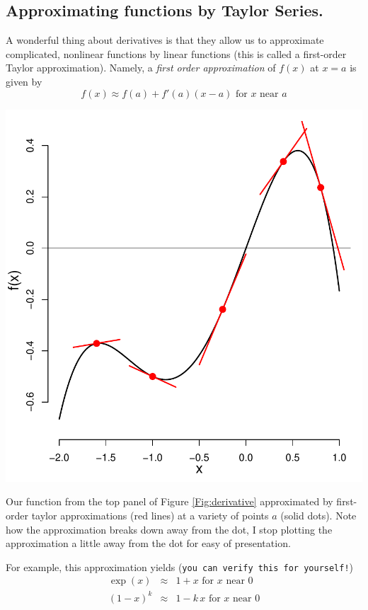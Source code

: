 \subsection{Approximating functions by Taylor Series.}
A wonderful thing about derivatives is that they allow us to approximate
complicated, nonlinear functions by linear functions (this is called a first-order
  Taylor approximation). Namely, a
\emph{first order approximation} of $f(x)$ at $x=a$ is given by 
\begin{equation}
  f(x) \approx f(a)+f'(a)(x-a) \mbox{ for $x$ near $a$}
  \end{equation}
 \begin{marginfigure}
 \begin{center}
   \includegraphics[width=\textwidth]{math_background/calc_pics/Taylor_1.pdf}\end{center}
 \caption{Our function from the top panel of Figure
   \ref{Fig:derivative} approximated by first-order taylor
   approximations (red lines) at a variety of points $a$ (solid
   dots). Note how the approximation breaks down away from the dot, I
   stop plotting the approximation a little away from the dot for easy
   of presentation. }\label{FigTaylor_1}
\end{marginfigure}
For example, this approximation yields (\texttt{you can verify this for yourself!}) 
\begin{eqnarray}
\exp(x)&\approx &1+x \mbox{ for $x$ near $0$}\\
(1-x)^k &\approx & 1-k\,x \mbox{ for $x$ near $0$}
\end{eqnarray}

